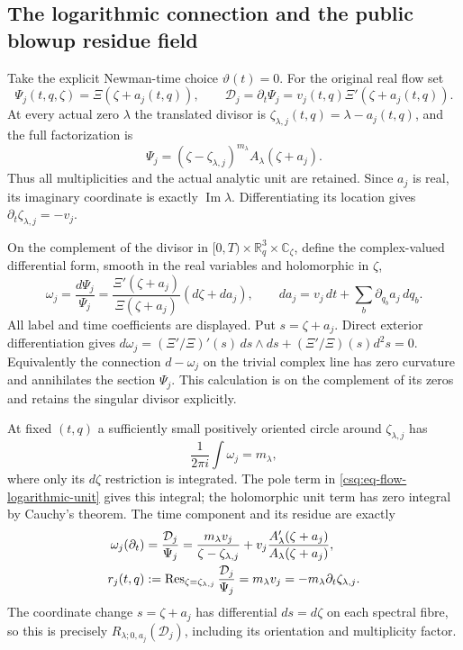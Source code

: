 \subsection{The logarithmic connection and the public blowup residue field}

Take the explicit Newman-time choice $\vartheta(t)=0$.
For the original real flow set
\[
 \Psi_j(t,q,\zeta)=\Xi(\zeta+a_j(t,q)),\qquad
 \mathcal D_j=\partial_t\Psi_j
             =v_j(t,q)\Xi'(\zeta+a_j(t,q)).
\]
At every actual zero $\lambda$ the translated divisor is
$\zeta_{\lambda,j}(t,q)=\lambda-a_j(t,q)$, and the full factorization
is
\[
 \Psi_j=
 (\zeta-\zeta_{\lambda,j})^{m_\lambda}
 A_\lambda(\zeta+a_j).
\]
Thus all multiplicities and the actual analytic unit are retained.
Since $a_j$ is real, its imaginary coordinate is exactly
$\operatorname{Im}\lambda$. Differentiating its location gives
$\partial_t\zeta_{\lambda,j}=-v_j$.

On the complement of the divisor in
$[0,T)\times\mathbb R^3_q\times\mathbb C_\zeta$, define the
complex-valued differential form, smooth in the real variables and
holomorphic in $\zeta$,
\begin{equation}
 \omega_j=\frac{d\Psi_j}{\Psi_j}
 =\frac{\Xi'(\zeta+a_j)}{\Xi(\zeta+a_j)}
                         (d\zeta+da_j),\qquad
 da_j=v_j\,dt+\sum_b\partial_{q_b}a_j\,dq_b .
 \label{csq:eq-flow-logarithmic-connection}
\end{equation}
All label and time coefficients are displayed. Put $s=\zeta+a_j$.
Direct exterior differentiation gives
$d\omega_j=(\Xi'/\Xi)'(s)\,ds\wedge ds+
(\Xi'/\Xi)(s)d^2s=0$.
Equivalently the connection $d-\omega_j$ on the trivial complex
line has zero curvature and annihilates the section $\Psi_j$.
This calculation is on the complement of its zeros and retains
the singular divisor explicitly.

At fixed $(t,q)$ a sufficiently small positively oriented circle
around $\zeta_{\lambda,j}$ has
\[
 \frac1{2\pi i}\int\omega_j=m_\lambda,
\]
where only its $d\zeta$ restriction is integrated. The pole term in
\eqref{csq:eq-flow-logarithmic-unit} gives this integral; the
holomorphic unit term has zero integral by Cauchy's theorem.
The time component and its residue are exactly
\begin{align}
 \omega_j(\partial_t)
 &=\frac{\mathcal D_j}{\Psi_j}
 =\frac{m_\lambda v_j}{\zeta-\zeta_{\lambda,j}}
       +v_j\frac{A_\lambda'(\zeta+a_j)}
                       {A_\lambda(\zeta+a_j)},\notag\\
 r_j(t,q)
 &:=\operatorname{Res}_{\zeta=\zeta_{\lambda,j}}
                    \frac{\mathcal D_j}{\Psi_j}
 =m_\lambda v_j
 =-m_\lambda\partial_t\zeta_{\lambda,j}.
 \label{csq:eq-flow-temporal-residue}
\end{align}
The coordinate change $s=\zeta+a_j$ has differential $ds=d\zeta$
on each spectral fibre, so this is precisely
$R_{\lambda;0,a_j}(\mathcal D_j)$, including its orientation
and multiplicity factor.

